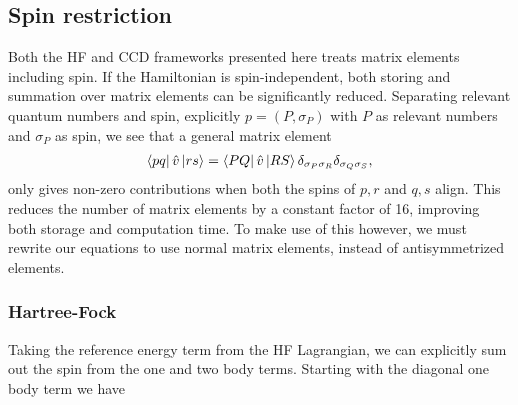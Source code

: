\subsection{Spin restriction}
Both the HF and CCD frameworks presented here treats matrix elements including spin. If the Hamiltonian is spin-independent, both storing and summation over matrix elements can be significantly reduced. Separating relevant quantum numbers and spin, explicitly $p = (P,\sigma_P)$ with $P$ as relevant numbers and $\sigma_P$ as spin, we see that a general matrix element
\begin{align*}
    \bra{pq}\hat{v}\ket{rs} = \bra{PQ}\hat{v}\ket{RS} \delta_{\sigma_P \sigma_R} \delta_{\sigma_Q \sigma_S},
\end{align*}
only gives non-zero contributions when both the spins of $p,r$ and $q,s$ align. This reduces the number of matrix elements by a constant factor of 16, improving both storage and computation time. To make use of this however, we must rewrite our equations to use normal matrix elements, instead of antisymmetrized elements. 
\subsubsection{Hartree-Fock}
Taking the reference energy term from the HF Lagrangian, we can explicitly sum out the spin from the one and two body terms. Starting with the diagonal one body term we have

